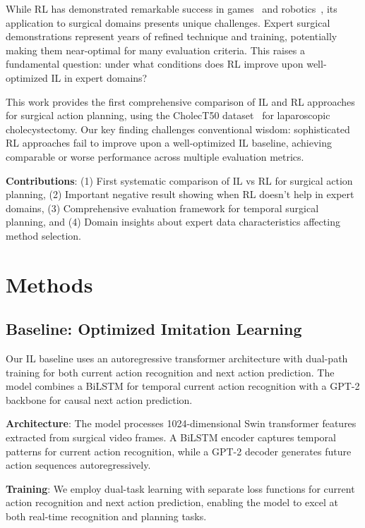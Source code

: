 \documentclass[runningheads]{llncs}
\begin{document}
While RL has demonstrated remarkable success in games~\cite{mnih2015human} and robotics~\cite{levine2016end}, its application to surgical domains presents unique challenges. Expert surgical demonstrations represent years of refined technique and training, potentially making them near-optimal for many evaluation criteria. This raises a fundamental question: under what conditions does RL improve upon well-optimized IL in expert domains?

This work provides the first comprehensive comparison of IL and RL approaches for surgical action planning, using the CholecT50 dataset~\cite{nwoye2022cholect50} for laparoscopic cholecystectomy. Our key finding challenges conventional wisdom: sophisticated RL approaches fail to improve upon a well-optimized IL baseline, achieving comparable or worse performance across multiple evaluation metrics.

\textbf{Contributions}: (1) First systematic comparison of IL vs RL for surgical action planning, (2) Important negative result showing when RL doesn't help in expert domains, (3) Comprehensive evaluation framework for temporal surgical planning, and (4) Domain insights about expert data characteristics affecting method selection.

\section{Methods}

\subsection{Baseline: Optimized Imitation Learning}

Our IL baseline uses an autoregressive transformer architecture with dual-path training for both current action recognition and next action prediction. The model combines a BiLSTM for temporal current action recognition with a GPT-2 backbone for causal next action prediction.

\textbf{Architecture}: The model processes 1024-dimensional Swin transformer features~\cite{liu2021swin} extracted from surgical video frames. A BiLSTM encoder captures temporal patterns for current action recognition, while a GPT-2 decoder generates future action sequences autoregressively.

\textbf{Training}: We employ dual-task learning with separate loss functions for current action recognition and next action prediction, enabling the model to excel at both real-time recognition and planning tasks.
\end{document}
